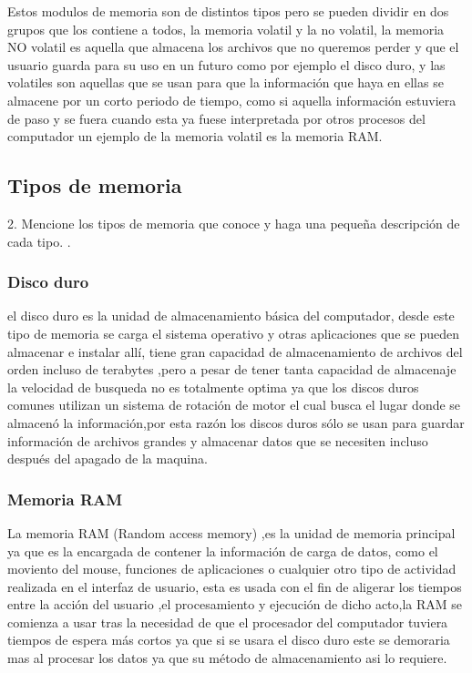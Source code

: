 \documentclass{article}
\begin{document}
\vspace{0.3cm}
Estos modulos de memoria son de distintos tipos pero se pueden dividir en dos grupos que los contiene a todos, la memoria volatil y la no volatil, la memoria NO volatil es aquella que almacena los archivos que no queremos perder y que el usuario guarda para su uso en un futuro como por ejemplo el disco duro, y las volatiles son aquellas que se usan para que la información que haya en ellas se almacene por un corto periodo de tiempo, como si aquella información estuviera de paso y se fuera cuando esta ya fuese interpretada por otros procesos del computador un ejemplo de la memoria volatil es la memoria RAM.

\vfill
\vspace{0.9cm}
\subsection{Tipos de memoria}
2. Mencione los tipos de memoria que conoce y haga una pequeña descripción de cada tipo.
. \cite{refer}
\subsubsection{Disco duro}
el disco duro es la unidad de almacenamiento básica del computador, desde este tipo de memoria se carga el sistema operativo y otras aplicaciones que se pueden almacenar e instalar allí, tiene gran capacidad de almacenamiento de archivos del orden incluso de terabytes ,pero a pesar de tener tanta capacidad de almacenaje la velocidad de busqueda no es totalmente optima ya que los discos duros comunes utilizan un sistema de rotación de motor el cual busca el lugar donde se almacenó la información,por esta razón los discos duros sólo se usan para guardar información de archivos grandes y almacenar datos que se necesiten incluso después del apagado de la maquina.
\subsubsection{Memoria RAM}\label{memorias}
La memoria RAM (Random access memory) ,es la unidad de memoria principal ya que es la  encargada de contener la información de carga de datos, como el moviento del mouse, funciones de aplicaciones o cualquier otro tipo de actividad realizada en el interfaz de usuario, esta es usada con el fin de aligerar los tiempos entre la acción del usuario ,el procesamiento y ejecución de dicho acto,la RAM se comienza a usar tras la necesidad de que el procesador del computador tuviera tiempos de espera más cortos  ya que si se usara el disco duro este se demoraria mas al procesar los datos ya que su método de almacenamiento asi lo requiere.
\end{document}
